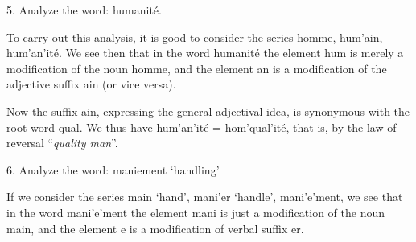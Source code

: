 {    5. Analyze the word: \textup{humanité}.

    To carry out this analysis, it is good to consider the series
    \textup{homme}, \textup{hum'ain}, \textup{hum'an'ité}. We see
    then that in the word \textup{humanité} the element \textup{hum}
    is merely a modification of the noun \textup{homme}, and the
    element \textup{an} is a modification of the adjective suffix
    \textup{ain} (or vice versa).

    Now the suffix \textup{ain}, expressing the general adjectival
    idea, is synonymous with the root word \textup{qual}.  We thus
    have \textup{hum'an'ité} = \textup{hom'qual'ité}, that is, by
    the law of reversal ``\emph{quality man}''.

    6. Analyze the word: \textup{maniement} `handling'

    If we consider the series \textup{main} `hand', \textup{mani'er}
    `handle', \textup{mani'e'ment}, we see that in the word
    \textup{mani'e'ment} the element \textup{mani} is just a
    modification of the noun \textup{main}, and the element \textup{e}
    is a modification of verbal suffix \textup{er}.
    }

